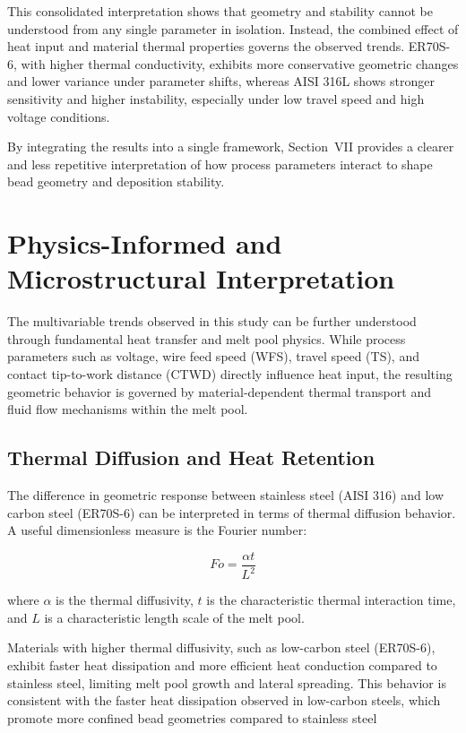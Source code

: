 \documentclass[conference]{IEEEtran}
\begin{document}
This consolidated interpretation shows that geometry and stability cannot be understood from any single parameter in isolation. 
Instead, the combined effect of heat input and material thermal properties governs the observed trends. 
ER70S-6, with higher thermal conductivity, exhibits more conservative geometric changes and lower variance under parameter shifts, whereas AISI 316L shows stronger sensitivity and higher instability, especially under low travel speed and high voltage conditions.

By integrating the results into a single framework, Section~VII provides a clearer and less repetitive interpretation of how process parameters interact to shape bead geometry and deposition stability.







\section{Physics-Informed and Microstructural Interpretation}

The multivariable trends observed in this study can be further understood through fundamental heat transfer and melt pool physics. While process parameters such as voltage, wire feed speed (WFS), travel speed (TS), and contact tip-to-work distance (CTWD) directly influence heat input, the resulting geometric behavior is governed by material-dependent thermal transport and fluid flow mechanisms within the melt pool.

\subsection{Thermal Diffusion and Heat Retention}

The difference in geometric response between stainless steel (AISI 316) and low carbon steel (ER70S-6) can be interpreted in terms of thermal diffusion behavior. A useful dimensionless measure is the Fourier number:

\begin{equation}
Fo = \frac{\alpha t}{L^2}
\end{equation}

where $\alpha$ is the thermal diffusivity, $t$ is the characteristic thermal interaction time, and $L$ is a characteristic length scale of the melt pool.

Materials with higher thermal diffusivity, such as low-carbon steel (ER70S-6), exhibit faster heat dissipation and more efficient heat conduction compared to stainless steel, limiting melt pool growth and lateral spreading. This 
behavior is consistent with the faster heat dissipation observed in 
low-carbon steels, which promote more confined bead geometries 
compared to stainless steel \cite{fouad2025,debroy2018,Le2022}
\end{document}
